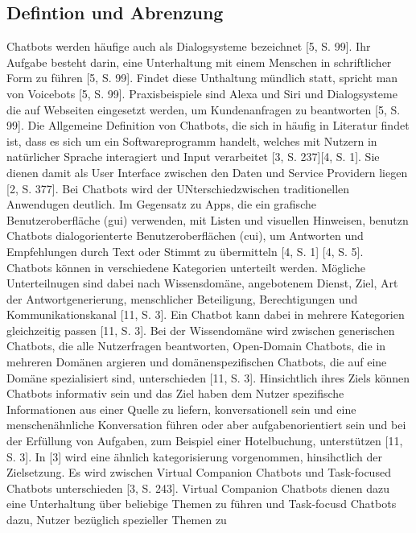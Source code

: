 \subsection{Defintion und Abrenzung}

Chatbots werden häufige auch als Dialogsysteme bezeichnet [5, S. 99]. Ihr Aufgabe besteht darin, eine Unterhaltung mit einem Menschen in schriftlicher Form 
zu führen [5, S. 99]. Findet diese Unthaltung mündlich statt, spricht man von Voicebots [5, S. 99]. Praxisbeispiele sind Alexa und Siri und Dialogsysteme die auf
Webseiten eingesetzt werden, um Kundenanfragen zu beantworten [5, S. 99]. Die Allgemeine Definition von Chatbots, die sich in häufig in Literatur findet ist, 
dass es sich um ein Softwareprogramm handelt, welches mit Nutzern in natürlicher Sprache interagiert und Input verarbeitet [3, S. 237][4, S. 1]. Sie dienen damit
als User Interface zwischen den Daten und Service Providern liegen [2, S. 377]. Bei Chatbots wird der UNterschiedzwischen traditionellen Anwendugen deutlich. Im 
Gegensatz zu Apps, die ein grafische Benutzeroberfläche (\ac{gui}) verwenden, mit Listen und visuellen Hinweisen, benutzn Chatbots dialogorienterte
Benutzeroberflächen (\ac{cui}), um Antworten und Empfehlungen durch Text oder Stimmt zu übermitteln  [4, S. 1] [4, S. 5]. \\
Chatbots können in verschiedene Kategorien unterteilt werden. Mögliche Unterteilnugen sind dabei nach Wissensdomäne, angebotenem Dienst, Ziel, Art der 
Antwortgenerierung, menschlicher Beteiligung, Berechtigungen und Kommunikationskanal [11, S. 3]. Ein Chatbot kann dabei in mehrere Kategorien gleichzeitig 
passen [11, S. 3]. Bei der Wissendomäne wird zwischen generischen Chatbots, die alle Nutzerfragen beantworten, Open-Domain Chatbots, die in mehreren 
Domänen argieren und domänenspezifischen Chatbots, die auf eine Domäne spezialisiert sind, unterschieden [11, S. 3]. Hinsichtlich ihres Ziels können Chatbots 
informativ sein und das Ziel haben dem Nutzer spezifische Informationen aus einer Quelle zu liefern, konversationell sein und eine menschenähnliche Konversation
führen oder aber aufgabenorientiert sein und bei der Erfüllung von Aufgaben, zum Beispiel einer Hotelbuchung, unterstützen [11, S. 3]. In [3] wird eine ähnlich 
kategorisierung vorgenommen, hinsihctlich der Zielsetzung. Es wird zwischen Virtual Companion Chatbots und Task-focused Chatbots unterschieden [3, S. 243]. 
Virtual Companion Chatbots dienen dazu eine Unterhaltung über beliebige Themen zu führen und Task-focusd Chatbots dazu, Nutzer bezüglich spezieller Themen zu
